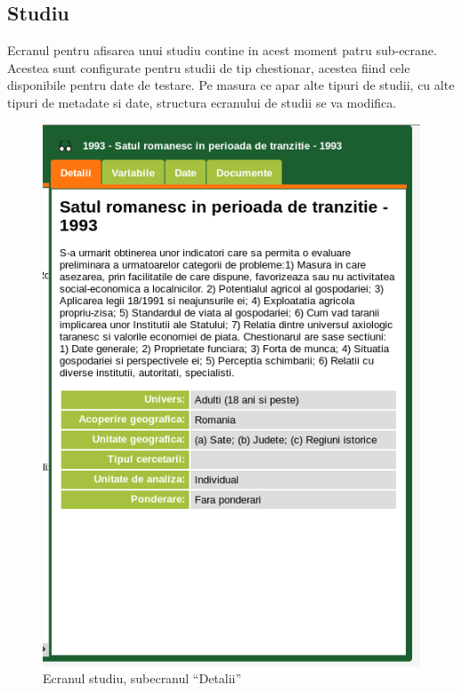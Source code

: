 \subsection{Studiu}

Ecranul pentru afisarea unui studiu contine in acest moment patru
sub-ecrane. Acestea sunt configurate pentru studii de tip chestionar,
acestea fiind cele disponibile pentru date de testare. Pe masura ce
apar alte tipuri de studii, cu alte tipuri de metadate si date, structura
ecranului de studii se va modifica. 

\begin{figure}[H]
\begin{centering}
\includegraphics{screenshots/details-panel-study-detalii}
\par\end{centering}
\caption{Ecranul studiu, subecranul ``Detalii''}
\end{figure}

